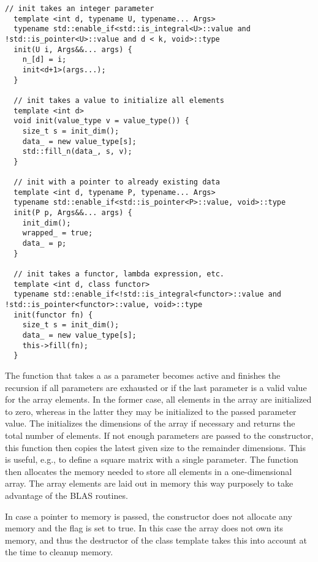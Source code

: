\documentclass[11pt]{article}
\newcommand{\code}[1]{{\footnotesize\ttfamily{#1}}}
\begin{document}
\begin{lstlisting}[caption={Variadic constructor delegate function \code{init}}, label=lst:init]
  // init takes an integer parameter
  template <int d, typename U, typename... Args>
  typename std::enable_if<std::is_integral<U>::value and !std::is_pointer<U>::value and d < k, void>::type
  init(U i, Args&&... args) {
    n_[d] = i;
    init<d+1>(args...);
  }
      
  // init takes a value to initialize all elements
  template <int d>
  void init(value_type v = value_type()) {
    size_t s = init_dim();
    data_ = new value_type[s];
    std::fill_n(data_, s, v);
  }
  
  // init with a pointer to already existing data
  template <int d, typename P, typename... Args>
  typename std::enable_if<std::is_pointer<P>::value, void>::type
  init(P p, Args&&... args) {
    init_dim();
    wrapped_ = true;
    data_ = p;
  }
  
  // init takes a functor, lambda expression, etc.
  template <int d, class functor>
  typename std::enable_if<!std::is_integral<functor>::value and !std::is_pointer<functor>::value, void>::type
  init(functor fn) {
    size_t s = init_dim();
    data_ = new value_type[s];
    this->fill(fn);
  }
\end{lstlisting}


The \code{init} function that takes a \code{value\_type} as a parameter becomes active and finishes the recursion if all parameters are exhausted or if the last parameter is a valid value for the array elements.
In the former case, all elements in the array are initialized to zero, whereas in the latter they may be initialized to the passed parameter value.
The \code{init\_dim} initializes the dimensions of the array if necessary and returns the total number of elements. If not enough parameters are passed to the constructor, this function then copies the latest given size to the remainder dimensions. This is useful, e.g., to define a square matrix with a single parameter. 
The function then allocates the memory needed to store all elements in a one-dimensional array. The array elements are laid out in memory this way purposely to take advantage of the BLAS routines. 


In case a pointer to memory is passed, the constructor does not allocate any memory and the \code{wrapped\_} flag is set to true. In this case the array does not own its memory, and thus the destructor of the class template takes this into account at the time to cleanup memory.
\end{document}
